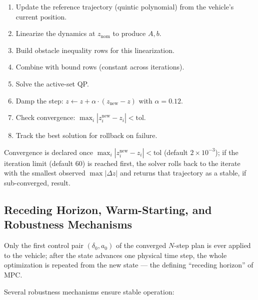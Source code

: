 ﻿\documentclass[11pt,a4paper]{article}
\begin{document}
\begin{enumerate}[leftmargin=1.2cm]
  \item Update the reference trajectory (quintic polynomial) from the vehicle's current position.
  \item Linearize the dynamics at $z_{\text{nom}}$ to produce $A, b$.
  \item Build obstacle inequality rows for this linearization.
  \item Combine with bound rows (constant across iterations).
  \item Solve the active-set QP.
  \item Damp the step: $z \leftarrow z + \alpha \cdot (z_{\text{new}} - z)$ with $\alpha = 0.12$.
  \item Check convergence: $\max_i |z^{\text{new}}_i - z_i| < \text{tol}$.
  \item Track the best solution for rollback on failure.
\end{enumerate}

Convergence is declared once $\max_i |z^{\text{new}}_i - z_i| < \text{tol}$ (default $2\times10^{-3}$); if the iteration limit (default $60$) is reached first, the solver rolls back to the iterate with the smallest observed $\max|\Delta z|$ and returns that trajectory as a stable, if sub-converged, result.

\subsection{Receding Horizon, Warm-Starting, and Robustness Mechanisms}
Only the first control pair $(\delta_0, a_0)$ of the converged $N$-step plan is ever applied to the vehicle; after the state advances one physical time step, the whole optimization is repeated from the new state --- the defining ``receding horizon'' of MPC.

Several robustness mechanisms ensure stable operation:
\end{document}
